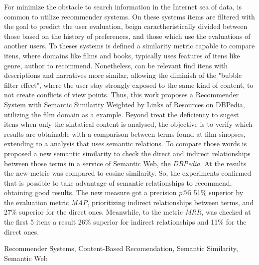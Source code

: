 For minimize the obstacle to search information in the Internet sea of data, is common to utilize recommender systems. On these systems items are filtered with the goal to predict the user evaluation, beign caractheristically divided between those based on the history of preferences, and those which use the evaluations of another users. To theses systems is defined a similarity metric capable to compare itens, where domains like films and books, typically uses features of itens like genre, author to recommend. Nonetheless, can be relevant find itens with descriptions and narratives more similar, allowing the diminish of the "bubble filter effect", where the user stay strongly exposed to the same kind of content, to not create conflicts of view points. Thus,  this work  proposes a Recommender System with Semantic Similarity Weighted by Links of Resources on DBPedia, utilizing the film domain as a example. Beyond treat the deficiency to sugest itens when only the sintatical content is analysed, the objective is to verify which results are obtainable with a comparison between terms found at film sinopses, extending to a analysis that uses semantic relations. To compare those words is proposed a new semantic similarity to check the direct and indirect relationships between those terms in a service of Semantic Web, the \textit{DBPedia}. At the results the new metric was compared to cosine similarity. So, the experiments confirmed that is possible to take advantage of semantic relationships to recommend, obtaining good results. The new measure got a precision $p@5$ 51\% superior by the evaluation metric \textit{MAP}, prioritizing indirect relationships between terms, and 27\% superior for the direct ones. Meanwhile, to the metric \textit{MRR}, was checked at the first 5 itens a result 26\% superior for indirect relationships and 11\% for the direct ones.

\begin{keywords}
	Recommender Systems, Content-Based Recomendation, Semantic Similarity, Semantic Web
\end{keywords}